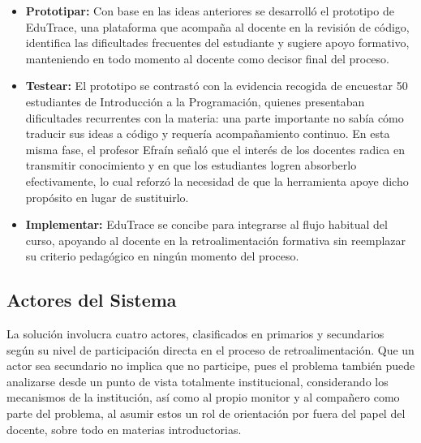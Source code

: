 \documentclass[letterpaper, 10 pt, conference]{ieeeconf}
\begin{document}
\begin{itemize}
\begin{itemize}
		\item Integración con Git para incorporar la herramienta al flujo de trabajo habitual del curso.
	\end{itemize}
	\item \textbf{Prototipar:} Con base en las ideas anteriores se desarrolló el prototipo de EduTrace, una plataforma que acompaña al docente en la revisión de código, identifica las dificultades frecuentes del estudiante y sugiere apoyo formativo, manteniendo en todo momento al docente como decisor final del proceso.
	\item \textbf{Testear:} El prototipo se contrastó con la evidencia recogida de encuestar 50 estudiantes de Introducción a la Programación, quienes presentaban dificultades recurrentes con la materia: una parte importante no sabía cómo traducir sus ideas a código y requería acompañamiento continuo. En esta misma fase, el profesor Efraín señaló que el interés de los docentes radica en transmitir conocimiento y en que los estudiantes logren absorberlo efectivamente, lo cual reforzó la necesidad de que la herramienta apoye dicho propósito en lugar de sustituirlo.
	\item \textbf{Implementar:} EduTrace se concibe para integrarse al flujo habitual del curso, apoyando al docente en la retroalimentación formativa sin reemplazar su criterio pedagógico en ningún momento del proceso.
\end{itemize}

\subsection{Actores del Sistema}
La solución involucra cuatro actores, clasificados en primarios y secundarios según su nivel de participación directa en el proceso de retroalimentación. Que un actor sea secundario no implica que no participe, pues el problema también puede analizarse desde un punto de vista totalmente institucional, considerando los mecanismos de la institución, así como al propio monitor y al compañero como parte del problema, al asumir estos un rol de orientación por fuera del papel del docente, sobre todo en materias introductorias.
\end{document}
